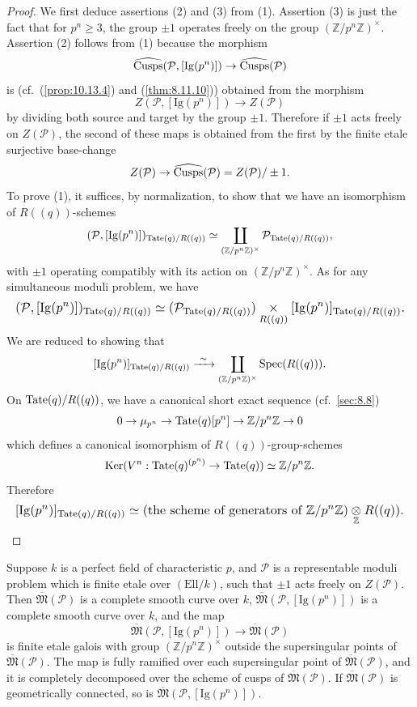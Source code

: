 \begin{proof}
We first deduce assertions (2) and (3) from (1). Assertion (3) is just the fact that for $p^n \ge 3$, the group $\pm 1$ operates freely on the group $(\mathbb{Z}/p^n\mathbb{Z})^\times$. Assertion (2) follows from (1) because the morphism
\[
\widehat{\operatorname{Cusps}}(\mathcal{P}, [\mathrm{Ig}(p^n)]) \to \widehat{\operatorname{Cusps}}(\mathcal{P})
\]
is (cf.~(\ref{prop:10.13.4}) and (\ref{thm:8.11.10})) obtained from the morphism
\[
Z(\mathcal{P}, [\mathrm{Ig}(p^n)]) \to Z(\mathcal{P})
\]
by dividing both source and target by the group $\pm 1$. Therefore if $\pm 1$ acts freely on $Z(\mathcal{P})$, the second of these maps is obtained from the first by the finite etale surjective base-change
\[
Z(\mathcal{P}) \to \widehat{\operatorname{Cusps}}(\mathcal{P}) = Z(\mathcal{P})/\pm 1 .
\]
To prove (1), it suffices, by normalization, to show that we have an isomorphism of $R((q))$-schemes
\[
(\mathcal{P}, [\mathrm{Ig}(p^n)])_{\mathrm{Tate}(q)/R((q))} \simeq \coprod_{(\mathbb{Z}/p^n\mathbb{Z})^\times} \mathcal{P}_{\mathrm{Tate}(q)/R((q))} ,
\]
with $\pm 1$ operating compatibly with its action on $(\mathbb{Z}/p^n\mathbb{Z})^\times$. As for any simultaneous moduli problem, we have
\[
\resizebox{\linewidth}{!}{$\displaystyle
(\mathcal{P}, [\mathrm{Ig}(p^n)])_{\Tate(q)/R((q))} \simeq (\mathcal{P}_{\Tate(q)/R((q))}) \fib{R((q))} [\mathrm{Ig}(p^n)]_{\Tate(q)/R((q))} .
$}
\]
We are reduced to showing that
\[
[\mathrm{Ig}(p^n)]_{\mathrm{Tate}(q)/R((q))} \xrightarrow{\ \sim\ } \coprod_{(\mathbb{Z}/p^n\mathbb{Z})^\times} \operatorname{Spec}(R((q))) .
\]
On $\mathrm{Tate}(q)/R((q))$, we have a canonical short exact sequence (cf.~\ref{sec:8.8})
\[
0 \to \mu_{p^n} \to \mathrm{Tate}(q)[p^n] \to \mathbb{Z}/p^n\mathbb{Z} \to 0
\]
which defines a canonical isomorphism of $R((q))$-group-schemes
\[
\operatorname{Ker}(V^n : \mathrm{Tate}(q)^{(p^n)} \to \mathrm{Tate}(q)) \simeq \mathbb{Z}/p^n\mathbb{Z} .
\]
Therefore
\[
\resizebox{\linewidth}{!}{$\displaystyle
[\mathrm{Ig}(p^n)]_{\Tate(q)/R((q))} \simeq (\text{the scheme of generators of } \mathbb{Z}/p^n\mathbb{Z}) \tens{\mathbb{Z}} R((q)) .
$} \qedhere
\]
\end{proof}

\begin{kcor}\label{cor:12.7.2}
Suppose $k$ is a perfect field of characteristic $p$, and $\mathcal{P}$ is a representable moduli problem which is finite etale over $(\mathrm{Ell}/k)$, such that $\pm 1$ acts freely on $Z(\mathcal{P})$. Then $\overline{\mathfrak{M}}(\mathcal{P})$ is a complete smooth curve over $k$, $\overline{\mathfrak{M}}(\mathcal{P}, [\mathrm{Ig}(p^n)])$ is a complete smooth curve over $k$, and the map
\[
\overline{\mathfrak{M}}(\mathcal{P}, [\mathrm{Ig}(p^n)]) \to \overline{\mathfrak{M}}(\mathcal{P})
\]
is finite etale galois with group $(\mathbb{Z}/p^n\mathbb{Z})^\times$ outside the supersingular points of $\overline{\mathfrak{M}}(\mathcal{P})$. The map is fully ramified over each supersingular point of $\overline{\mathfrak{M}}(\mathcal{P})$, and it is completely decomposed over the scheme of cusps of $\overline{\mathfrak{M}}(\mathcal{P})$. If $\overline{\mathfrak{M}}(\mathcal{P})$ is geometrically connected, so is $\overline{\mathfrak{M}}(\mathcal{P}, [\mathrm{Ig}(p^n)])$.
\end{kcor}

